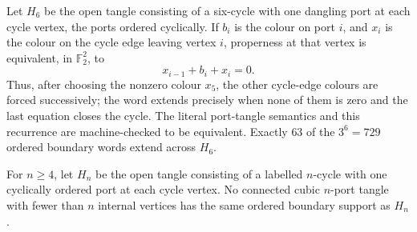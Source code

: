 Let \(H_6\) be the open tangle consisting of a six-cycle with one dangling
port at each cycle vertex, the ports ordered cyclically.  If \(b_i\) is the
colour on port \(i\), and \(x_i\) is the colour on the cycle edge leaving
vertex \(i\), properness at that vertex is equivalent, in
\(\mathbb F_2^2\), to
\[
                         x_{i-1}+b_i+x_i=0.
\]
Thus, after choosing the nonzero colour \(x_5\), the other cycle-edge
colours are forced successively; the word extends precisely when none of
them is zero and the last equation closes the cycle.  The literal port-tangle
semantics and this recurrence are machine-checked to be equivalent.
Exactly \(63\) of the \(3^6=729\) ordered boundary words extend across
\(H_6\).

\begin{proposition}
\label{prop:facial-cycle-no-smaller-exact-replacement}
\Sprose
For \(n\geq4\), let \(H_n\) be the open tangle consisting of a labelled
\(n\)-cycle with one cyclically ordered port at each cycle vertex.  No
connected cubic \(n\)-port tangle with fewer than \(n\) internal vertices
has the same ordered boundary support as \(H_n\).
\end{proposition}

